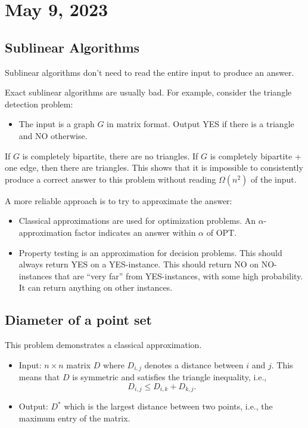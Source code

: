 \section{May 9, 2023}

\subsection{Sublinear Algorithms}

\begin{definition}

Sublinear algorithms don't need to read the entire input to produce an answer.
\end{definition}

Exact sublinear algorithms are usually bad. For example, consider the triangle detection problem: 
\begin{itemize}
    \item The input is a graph $G$ in matrix format. Output YES if there is a triangle and NO otherwise. 
\end{itemize}

If $G$ is completely bipartite, there are no triangles. If $G$ is completely bipartite + one edge, then there are triangles. This shows that it is impossible to consistently produce a correct answer to this problem without reading $\Omega(n^2)$ of the input. 

A more reliable approach is to try to approximate the answer:
\begin{itemize}
    \item \ac{Classical approximations} are used for optimization problems. An $\alpha$-approximation factor indicates an answer within $\alpha$ of OPT.
    \item \ac{Property testing} is an approximation for decision problems. This should always return YES on a YES-instance. This should return NO on NO-instances that are ``very far'' from YES-instances, with some high probability. It can return anything on other instances. 
\end{itemize}

\subsection{Diameter of a point set}

This problem demonstrates a classical approximation. 

\begin{itemize}
    \item Input: $n\times n$ matrix $D$ where $D_{i,j}$ denotes a distance between $i$ and $j$. This means that $D$ is symmetric and satisfies the triangle inequality, i.e., 
    \[D_{i,j}\leq D_{i,k} + D_{k,j}.\]
    \item Output: $D^*$ which is the largest distance between two points, i.e., the maximum entry of the matrix.
\end{itemize}

